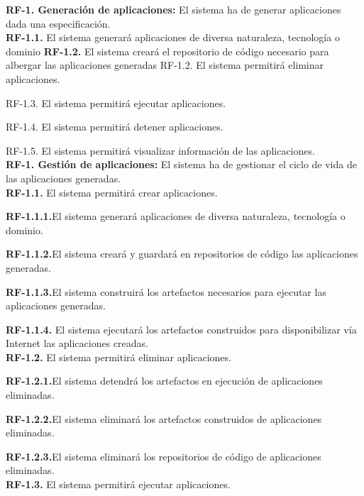 \documentclass[a4paper,11pt]{book}
\begin{document}
\textbf{RF-1. Generación de aplicaciones:} El sistema ha de generar  aplicaciones dada una especificación.\\
   

	\textbf{RF-1.1.} El sistema generará aplicaciones de diversa naturaleza, tecnología o dominio 
	\textbf{RF-1.2.}  El sistema creará el repositorio de código necesario para albergar las aplicaciones generadas
	RF-1.2. El sistema permitirá eliminar aplicaciones.

	RF-1.3. El sistema permitirá ejecutar aplicaciones.

	RF-1.4. El sistema permitirá detener aplicaciones.

	RF-1.5. El sistema permitirá visualizar información de las aplicaciones.\\



\textbf{RF-1. Gestión de aplicaciones:} El sistema ha de gestionar el ciclo de vida de las aplicaciones generadas.\\
   

	\textbf{RF-1.1.} El sistema permitirá crear aplicaciones.
	
	\quad \textbf{RF-1.1.1.}El sistema generará aplicaciones de diversa naturaleza, tecnología o dominio.
	
	\quad \textbf{RF-1.1.2.}El sistema creará y  guardará en repositorios de código las aplicaciones generadas.
	
	\quad \textbf{RF-1.1.3.}El sistema construirá los artefactos necesarios para ejecutar las aplicaciones generadas.
	
	\quad \textbf{RF-1.1.4.} El sistema ejecutará los artefactos construidos para disponibilizar vía Internet las aplicaciones creadas. \\



	\textbf{RF-1.2.} El sistema permitirá eliminar aplicaciones.
	
	\quad \textbf{RF-1.2.1.}El sistema detendrá los artefactos en ejecución de aplicaciones eliminadas. 
	
	\quad \textbf{RF-1.2.2.}El sistema eliminará los artefactos construidos de aplicaciones eliminadas. 
	
	\quad \textbf{RF-1.2.3.}El sistema eliminará los repositorios de código de aplicaciones eliminadas. \\
	

	
	\textbf{RF-1.3.} El sistema permitirá ejecutar aplicaciones.
	
\end{document}
